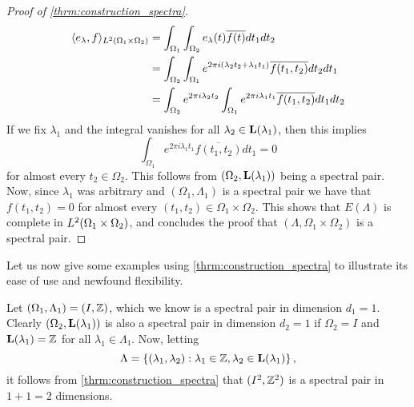 \documentclass[../thesis.tex]{subfiles}
\begin{document}
\begin{proof}[Proof of \cref{thrm:construction_spectra}]
    \begin{align*} %
        \braa{e_\lambda,f}_{L^2\brac{\Omega_1 \times \Omega_2}}
        &= \int_{\Omega_1} \int_{\Omega_2} e_\lambda(t) \overline{f(t)} dt_1dt_2 \\
        &= \int_{\Omega_2} \int_{\Omega_1} e^{2\pi i  (\lambda_2 t_2+\lambda_1 t_1)} \overline{f(t_1,t_2)} dt_2 dt_1 \\
        &= \int_{\Omega_2} e^{2 \pi i \lambda_2 t_2} \int_{\Omega_1}e^{2 \pi i \lambda_1 t_1} \overline{f(t_1,t_2)} dt_1 dt_2
    \end{align*}
    If we fix $\lambda_1$ and the integral vanishes for all $\lambda_2 \in \mathbf{L}(\lambda_1)$, then this implies 
    \begin{equation*}
        \int_{\Omega_1}e^{2 \pi i \lambda_1 t_1} \overline{f(t_1,t_2)} dt_1 = 0
    \end{equation*}
    for almost every $t_2\in \Omega_2$. This follows from $(\Omega_2,\mathbf{L}(\lambda_1))$ being a spectral pair. Now, since $\lambda_1$ was arbitrary and $(\Omega_1,\Lambda_1)$ is a spectral pair we have that $f(t_1, t_2)=0$ for almost every $(t_1,t_2) \in \Omega_1 \times \Omega_2$. 
    This shows that $E(\Lambda)$ is complete in $L^2(\Omega_1 \times \Omega_2)$, and concludes the proof that $(\Lambda, \Omega_1\times \Omega_2)$ is a spectral pair.
\end{proof}
Let us now give some examples using \cref{thrm:construction_spectra} to illustrate its ease of use and newfound flexibility. 
\begin{example}\label{ex:first_construction}
    Let $(\Omega_1,\Lambda_1)=(I, \mathbb{Z})$, which we know is a spectral pair in dimension $d_1=1$. Clearly $(\Omega_2,\mathbf{L}(\lambda_1))$ is also a spectral pair in dimension $d_2=1$ if $\Omega_2=I$ and $\mathbf{L}(\lambda_1) = \mathbb{Z}$ for all $\lambda_1 \in \Lambda_1$. Now, letting 
    \begin{equation}\label{eq:first_construction}
        \Lambda  = \left\{(\lambda_1,\lambda_2): \lambda_1 \in \mathbb{Z}, \lambda_2 \in \mathbf{L}(\lambda_1)\right\},
    \end{equation}
    it follows from \cref{thrm:construction_spectra} that $(I^2, \mathbb{Z}^2)$ is a spectral pair in $1+1=2$ dimensions.
\end{example}
\end{document}
